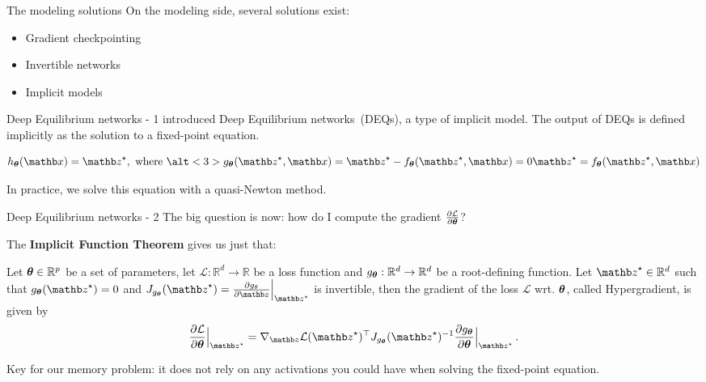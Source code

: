 \begin{frame}{The modeling solutions}
    On the modeling side, several solutions exist:
    \begin{itemize}[<+->]
        \item Gradient checkpointing~\citep{Chen2016TrainingCost}
        \item Invertible networks~\citep{Gomez2017TheActivations,Sander2021MomentumNetworks}
        \item Implicit models~\citep{Chen2018NeuralEquations,Bai2019DeepModels}
    \end{itemize}
\end{frame}

\begin{frame}{Deep Equilibrium networks - 1}
    \citet{Bai2019DeepModels} introduced Deep Equilibrium networks~(DEQs), a type of implicit model.
    The output of DEQs is defined implicitly as the solution to a fixed-point equation.

    \begin{equation*}
        h_{\thetab}(\xb) = \zb^\star, \text{ where } \alt<3>{g_\thetab(\zb^\star, \xb) = \zb^\star - f_\thetab(\zb^\star, \xb) = 0}{\zb^\star = f_\thetab(\zb^\star, \xb)}
    \end{equation*}

    \pause

    In practice, we solve this equation with a quasi-Newton method.
\end{frame}

\begin{frame}{Deep Equilibrium networks - 2}
    The big question is now: how do I compute the gradient $\frac{\partial \mathcal{L}}{\partial {\ensuremath{\boldsymbol{\theta}}}}$?
    \pause

    The \textbf{Implicit Function Theorem} gives us just that:
    \begin{theorem}
        Let ${\boldsymbol{\theta}} \in \mathbb{R}^p$ be a set of parameters, let $\mathcal{L}: \mathbb{R}^d \rightarrow \mathbb{R}$ be a loss function and $g_{{\boldsymbol{\theta}}}: \mathbb{R}^d \rightarrow \mathbb{R}^d$ be a root-defining function.
Let $\zb^\star \in  \mathbb{R}^d$ such that $g_{\thetab}(\zb^\star) = 0$ and $J_{g_{\thetab}}(\zb^\star) = \frac{\partial g_{\theta}}{\partial \zb}\Bigr|_{\zb^\star}$ is invertible, then the gradient of the loss $\mathcal{L}$ wrt. ${\boldsymbol{\theta}}$, called Hypergradient, is given by
\begin{equation*}
    \frac{\partial \mathcal{L}}{\partial \thetab}\Bigr|_{\zb^\star} = \nabla_\zb \mathcal{L}(\zb^\star)^\top J_{g_{\thetab}}(\zb^\star)^{-1} \frac{\partial g_{\thetab}}{\partial \thetab}\Bigr|_{\zb^\star} \, .
\end{equation*}
    \end{theorem}
    \pause

    Key for our memory problem: it does not rely on any activations you could have when solving the fixed-point equation.
\end{frame}

